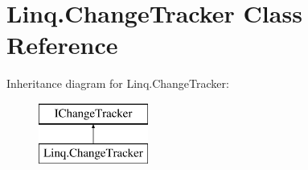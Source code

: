 \hypertarget{class_linq_1_1_change_tracker}{}\section{Linq.\+Change\+Tracker Class Reference}
\label{class_linq_1_1_change_tracker}
Inheritance diagram for Linq.\+Change\+Tracker\+:\begin{figure}[H]
\begin{center}
\leavevmode
\includegraphics[height=2.000000cm]{class_linq_1_1_change_tracker}
\end{center}
\end{figure}
